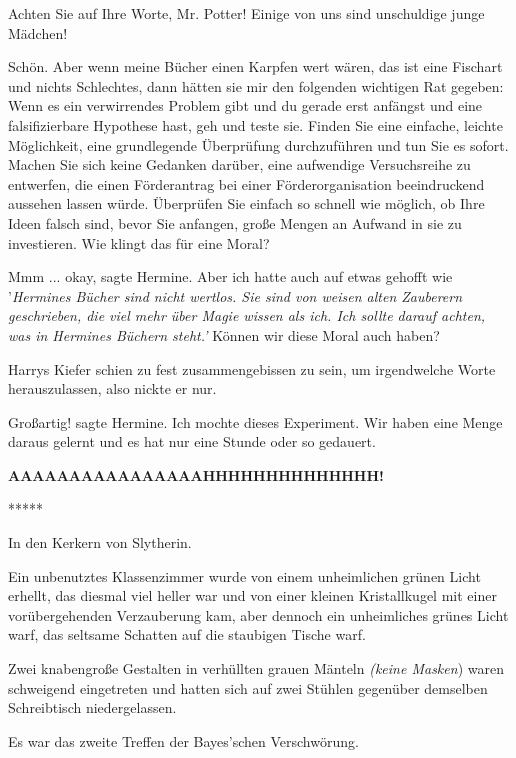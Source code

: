 \glqq Achten Sie auf Ihre Worte, Mr. Potter! Einige von uns sind unschuldige
junge Mädchen!\grqq{}

\glqq Schön. Aber wenn meine Bücher einen Karpfen wert wären, das ist eine
Fischart und nichts Schlechtes, dann hätten sie mir den folgenden wichtigen Rat
gegeben: Wenn es ein verwirrendes Problem gibt und du gerade erst anfängst und
eine falsifizierbare Hypothese hast, geh und teste sie. Finden Sie eine
einfache, leichte Möglichkeit, eine grundlegende Überprüfung durchzuführen und
tun Sie es sofort. Machen Sie sich keine Gedanken darüber, eine aufwendige
Versuchsreihe zu entwerfen, die einen Förderantrag bei einer Förderorganisation
beeindruckend aussehen lassen würde. Überprüfen Sie einfach so schnell wie
möglich, ob Ihre Ideen falsch sind, bevor Sie anfangen, große Mengen an Aufwand
in sie zu investieren. Wie klingt das für eine Moral?\grqq{}

\glqq Mmm ... okay\grqq{}, sagte Hermine. \glqq Aber ich hatte auch auf etwas
gehofft wie '\emph{Hermines Bücher sind nicht wertlos. Sie sind von weisen alten
Zauberern geschrieben, die viel mehr über Magie wissen als ich. Ich sollte
darauf achten, was in Hermines Büchern steht.'} Können wir diese Moral auch
haben?\grqq{}

Harrys Kiefer schien zu fest zusammengebissen zu sein, um irgendwelche Worte
herauszulassen, also nickte er nur.

\glqq Großartig!\grqq{} sagte Hermine. \glqq Ich mochte dieses Experiment. Wir
haben eine Menge daraus gelernt und es hat nur eine Stunde oder so
gedauert.\grqq{}

\textbf{\glqq AAAAAAAAAAAAAAAAHHHHHHHHHHHHHH!\grqq{} }

\begin{center}*****\end{center}

In den Kerkern von Slytherin.

Ein unbenutztes Klassenzimmer wurde von einem unheimlichen grünen Licht erhellt,
das diesmal viel heller war und von einer kleinen Kristallkugel mit einer
vorübergehenden Verzauberung kam, aber dennoch ein unheimliches grünes Licht
warf, das seltsame Schatten auf die staubigen Tische warf.

Zwei knabengroße Gestalten in verhüllten grauen Mänteln \emph{(keine Masken})
waren schweigend eingetreten und hatten sich auf zwei Stühlen gegenüber
demselben Schreibtisch niedergelassen.

Es war das zweite Treffen der Bayes'schen Verschwörung.


